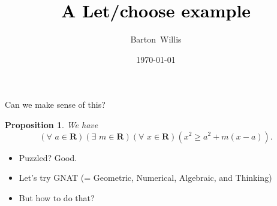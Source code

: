 \documentclass[usenames,dvipsnames,fleqn,leqno,10pt, pdflatex]{beamer}
\title[] %
{\textcolor{black}{\textbf{A Let/choose example}} \\ 
\vspace{0.2in}
}
\date{\today}
\author[] %
{Barton~Willis}
\newcommand{\reals}{\mathbf{R}}
\newtheorem{myprop}{Proposition}
\begin{document}
\frame{\titlepage}

\begin{frame}{Can we make sense of this?}

\begin{myprop}
We have
\begin{equation*}
    \left(\forall \,\, a \in \reals\right)\left(\exists \,\,  m \in \reals\right)\left (\forall \,\, x \in \reals \right)\left(x^2 \geq a^2 + m (x-a) \right).
\end{equation*}
\end{myprop}

\begin{itemize}
    \item Puzzled? Good.
    \item Let's try GNAT (= Geometric, Numerical, Algebraic, and Thinking)
    \item But how to do that?
 \end{itemize}

\vfill

\end{frame}
\end{document}
